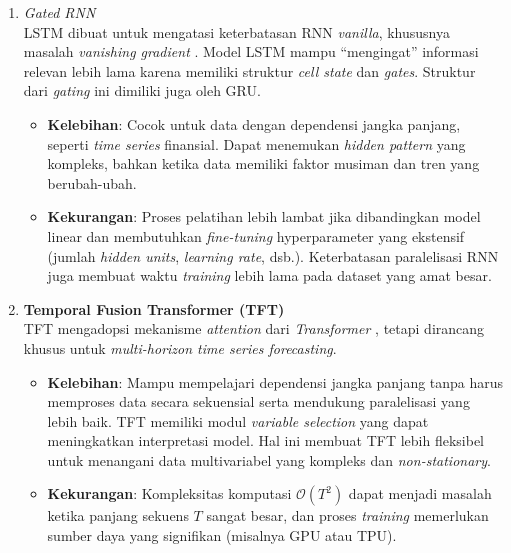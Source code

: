 \begin{enumerate}
    \item \textit{Gated RNN} 
    \\
    LSTM dibuat untuk mengatasi keterbatasan RNN \textit{vanilla}, khususnya masalah \textit{vanishing gradient} \parencite{Hochreiter1997}. Model LSTM mampu “mengingat” informasi relevan lebih lama karena memiliki struktur \textit{cell state} dan \textit{gates}. Struktur dari \textit{gating} ini dimiliki juga oleh GRU. 
    \begin{itemize}
        \item \textbf{Kelebihan}:  
        Cocok untuk data dengan dependensi jangka panjang, seperti \textit{time series} finansial. Dapat menemukan \textit{hidden pattern} yang kompleks, bahkan ketika data memiliki faktor musiman dan tren yang berubah-ubah.
        \item \textbf{Kekurangan}:  
        Proses pelatihan lebih lambat jika dibandingkan model linear dan membutuhkan \textit{fine-tuning} hyperparameter yang ekstensif (jumlah \textit{hidden units}, \textit{learning rate}, dsb.). Keterbatasan paralelisasi RNN juga membuat waktu \textit{training} lebih lama pada dataset yang amat besar.
    \end{itemize}

    \item \textbf{Temporal Fusion Transformer (TFT)} 
    \\
    TFT \parencite{Lim2020} mengadopsi mekanisme \textit{attention} dari \textit{Transformer} \parencite{Vaswani2017}, tetapi dirancang khusus untuk \textit{multi-horizon time series forecasting}. 
    \begin{itemize}
        \item \textbf{Kelebihan}:  
        Mampu mempelajari dependensi jangka panjang tanpa harus memproses data secara sekuensial serta mendukung paralelisasi yang lebih baik. TFT memiliki modul \textit{variable selection} yang dapat meningkatkan interpretasi model. Hal ini membuat TFT lebih fleksibel untuk menangani data multivariabel yang kompleks dan \textit{non-stationary}.
        \item \textbf{Kekurangan}:  
        Kompleksitas komputasi \(\mathcal{O}(T^2)\) dapat menjadi masalah ketika panjang sekuens \(T\) sangat besar, dan proses \textit{training} memerlukan sumber daya yang signifikan (misalnya GPU atau TPU).
    \end{itemize}
\end{enumerate}

